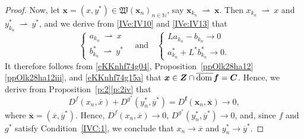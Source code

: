 \documentclass[a4paper,11pt,fleqn]{article}
\newcommand{\WC}{\ensuremath{{\mathfrak W}}}
\newcommand{\NN}{\ensuremath{\mathbb N}}
\newcommand{\weakly}{\ensuremath{\:\rightharpoonup\:}}
\newcommand{\dom}{\ensuremath{\text{\rm dom}\,}}
\theoremstyle{plain}{\theorembodyfont{\rmfamily}%
\newtheorem{conjecture}[theorem]{Conjecture}}
\theoremstyle{plain}{\theorembodyfont{\rmfamily}%
\newtheorem{example}[theorem]{Example}}
\theoremstyle{plain}{\theorembodyfont{\rmfamily}%
\newtheorem{remark}[theorem]{Remark}}
\theoremstyle{plain}{\theorembodyfont{\rmfamily}%
\newtheorem{algorithm}[theorem]{Algorithm}}
\theoremstyle{plain}{\theorembodyfont{\rmfamily}%
\newtheorem{condition}[theorem]{Condition}}
\theoremstyle{plain}{\theorembodyfont{\rmfamily}%
\newtheorem{definition}[theorem]{Definition}}
\theoremstyle{plain}{\theorembodyfont{\rmfamily}
\newtheorem{problem}[theorem]{Problem}}
\theoremstyle{plain}{\theorembodyfont{\rmfamily}
\newtheorem{notation}[theorem]{Notation}}
\numberwithin{equation}{section}
\begin{document}
\begin{proof}
Now, let 
$\boldsymbol{x}=(x,y^*)\in\WC(\boldsymbol{x}_n)_{n\in\NN}$,
say $\boldsymbol{x}_{k_n}\weakly\boldsymbol{x}$. 
Then $x_{k_n}\weakly x$ and $y_{k_n}^*\weakly y^*$, and we 
derive from \eqref{IVe:IV10} and \eqref{IVe:IV13} that
\begin{equation}
\label{IVe:IV11}
\begin{cases}
a_{k_n}\weakly x\\
b^*_{k_n}\weakly y^*
\end{cases}
\quad\text{and}\quad
\begin{cases}
La_{k_n}-b_{k_n}\to 0\\
a^*_{k_n}+L^*b^*_{k_n}\to 0.
\end{cases}
\end{equation}
It therefore follows from \eqref{eKKnhf74g04},
Proposition~\ref{ppOlk28ha12}\ref{ppOlk28ha12iii},
and \eqref{eKKnhf74g15a} that
$\boldsymbol{x}\in\boldsymbol{Z}\cap\overline{\dom}\boldsymbol{f}
=\boldsymbol{C}$. Hence, we derive from 
Proposition~\ref{p:2}\ref{p:2iv} that 
\begin{equation}
\label{eKKnhf74g15x}
D^{f}({x}_n,\overline{x})+D^{g^*}(y^*_n,\overline{y}^*)=
D^{\boldsymbol{f}}(\boldsymbol{x}_n,\overline{\boldsymbol{x}})\to 0,
\end{equation}
where $\overline{\boldsymbol{x}}=(\overline{x},\overline{y}^*)$.
Hence, $D^{f}({x}_n,\overline{x})\to 0$, 
$D^{g^*}(y^*_n,\overline{y}^*)\to 0$, and, 
since $f$ and $g^*$ satisfy Condition~\ref{IVC:1}, we conclude
that $x_n\to\overline{x}$ and $y^*_n\to\overline{y}^*$.
\end{proof}
\end{document}
